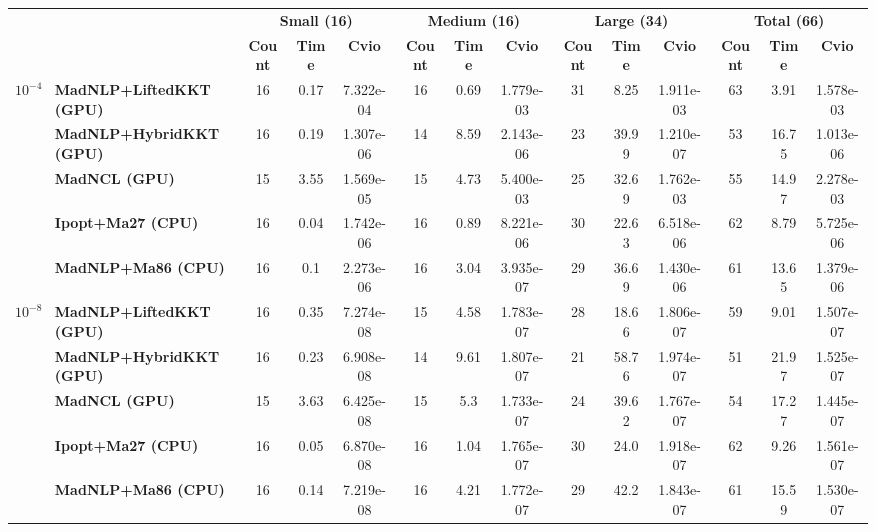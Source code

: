 \begin{center}
\renewcommand{\arraystretch}{0.9}
\begin{tabular}{|l|l|ccc|ccc|ccc|ccc|}
\hline
 & & \multicolumn{3}{c|}{\textbf{Small (16)}} & \multicolumn{3}{c|}{\textbf{Medium (16)}} & \multicolumn{3}{c|}{\textbf{Large (34)}} & \multicolumn{3}{c|}{\textbf{Total (66)}} \\
 & & \textbf{Count} & \textbf{Time} & \textbf{Cvio} & \textbf{Count} & \textbf{Time} & \textbf{Cvio} & \textbf{Count} & \textbf{Time} & \textbf{Cvio} & \textbf{Count} & \textbf{Time} & \textbf{Cvio}\\
\hline
\multirow{5}{*}{\Large\textbf{$10^{-4}$}} & \textbf{MadNLP+LiftedKKT (GPU)} & \cellcolor{blue!15}16 & 0.17 & 7.322e-04 & \cellcolor{blue!15}16 & \cellcolor{blue!15}0.69 & 1.779e-03 & \cellcolor{blue!15}31 & \cellcolor{blue!15}8.25 & 1.911e-03 & \cellcolor{blue!15}63 & \cellcolor{blue!15}3.91 & 1.578e-03 \\
 & \textbf{MadNLP+HybridKKT (GPU)} & \cellcolor{blue!15}16 & 0.19 & \cellcolor{blue!15}1.307e-06 & 14 & 8.59 & 2.143e-06 & 23 & 39.99 & \cellcolor{blue!15}1.210e-07 & 53 & 16.75 & \cellcolor{blue!15}1.013e-06 \\
 & \textbf{MadNCL (GPU)} & 15 & 3.55 & 1.569e-05 & 15 & 4.73 & 5.400e-03 & 25 & 32.69 & 1.762e-03 & 55 & 14.97 & 2.278e-03 \\
 & \textbf{Ipopt+Ma27 (CPU)} & \cellcolor{blue!15}16 & \cellcolor{blue!15}0.04 & 1.742e-06 & \cellcolor{blue!15}16 & 0.89 & 8.221e-06 & 30 & 22.63 & 6.518e-06 & 62 & 8.79 & 5.725e-06 \\
 & \textbf{MadNLP+Ma86 (CPU)} & \cellcolor{blue!15}16 & 0.1 & 2.273e-06 & \cellcolor{blue!15}16 & 3.04 & \cellcolor{blue!15}3.935e-07 & 29 & 36.69 & 1.430e-06 & 61 & 13.65 & 1.379e-06 \\
\hline
\multirow{5}{*}{\Large\textbf{$10^{-8}$}} & \textbf{MadNLP+LiftedKKT (GPU)} & \cellcolor{blue!15}16 & 0.35 & 7.274e-08 & 15 & 4.58 & 1.783e-07 & 28 & \cellcolor{blue!15}18.66 & 1.806e-07 & 59 & \cellcolor{blue!15}9.01 & 1.507e-07 \\
 & \textbf{MadNLP+HybridKKT (GPU)} & \cellcolor{blue!15}16 & 0.23 & 6.908e-08 & 14 & 9.61 & 1.807e-07 & 21 & 58.76 & 1.974e-07 & 51 & 21.97 & 1.525e-07 \\
 & \textbf{MadNCL (GPU)} & 15 & 3.63 & \cellcolor{blue!15}6.425e-08 & 15 & 5.3 & \cellcolor{blue!15}1.733e-07 & 24 & 39.62 & \cellcolor{blue!15}1.767e-07 & 54 & 17.27 & \cellcolor{blue!15}1.445e-07 \\
 & \textbf{Ipopt+Ma27 (CPU)} & \cellcolor{blue!15}16 & \cellcolor{blue!15}0.05 & 6.870e-08 & \cellcolor{blue!15}16 & \cellcolor{blue!15}1.04 & 1.765e-07 & \cellcolor{blue!15}30 & 24.0 & 1.918e-07 & \cellcolor{blue!15}62 & 9.26 & 1.561e-07 \\
 & \textbf{MadNLP+Ma86 (CPU)} & \cellcolor{blue!15}16 & 0.14 & 7.219e-08 & \cellcolor{blue!15}16 & 4.21 & 1.772e-07 & 29 & 42.2 & 1.843e-07 & 61 & 15.59 & 1.530e-07 \\
\hline
\end{tabular}
\end{center}
